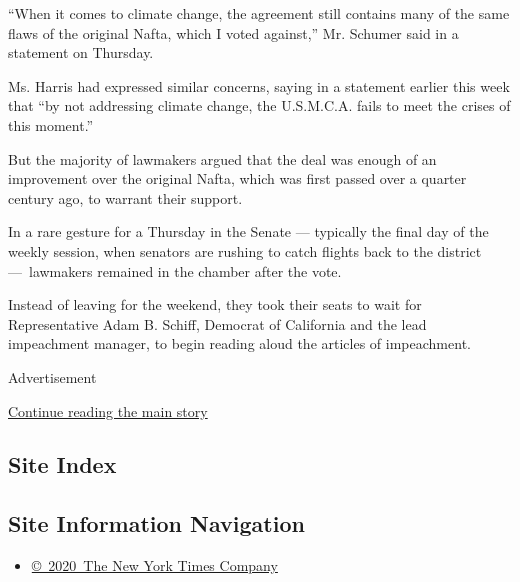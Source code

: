 ``When it comes to climate change, the agreement still contains many of
the same flaws of the original Nafta, which I voted against,'' Mr.
Schumer said in a statement on Thursday.

Ms. Harris had expressed similar concerns, saying in a statement earlier
this week that ``by not addressing climate change, the U.S.M.C.A. fails
to meet the crises of this moment.''

But the majority of lawmakers argued that the deal was enough of an
improvement over the original Nafta, which was first passed over a
quarter century ago, to warrant their support.

In a rare gesture for a Thursday in the Senate --- typically the final
day of the weekly session, when senators are rushing to catch flights
back to the district ---~lawmakers remained in the chamber after the
vote.

Instead of leaving for the weekend, they took their seats to wait for
Representative Adam B. Schiff, Democrat of California and the lead
impeachment manager, to begin reading aloud the articles of impeachment.

Advertisement

\protect\hyperlink{after-bottom}{Continue reading the main story}

\hypertarget{site-index}{%
\subsection{Site Index}\label{site-index}}

\hypertarget{site-information-navigation}{%
\subsection{Site Information
Navigation}\label{site-information-navigation}}

\begin{itemize}
\tightlist
\item
  \href{https://help.nytimes3xbfgragh.onion/hc/en-us/articles/115014792127-Copyright-notice}{©~2020~The
  New York Times Company}
\end{itemize}

